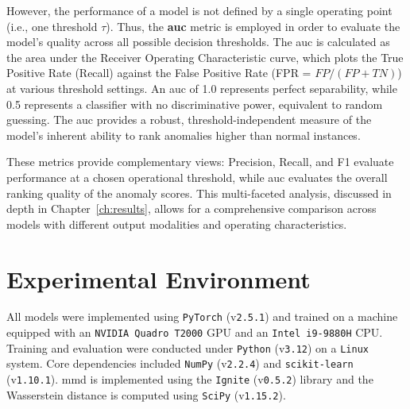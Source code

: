 However, the performance of a model is not defined by a single operating point (i.e., one threshold $\tau$). 
Thus, the \textbf{\gls{auc}} metric is employed in order to evaluate the model's quality across all possible decision thresholds. 
The \gls{auc} is calculated as the area under the Receiver Operating Characteristic curve, which plots the True Positive Rate (Recall) against the False Positive Rate (FPR = $FP / (FP + TN)$) at various threshold settings. 
An \gls{auc} of 1.0 represents perfect separability, while 0.5 represents a classifier with no discriminative power, equivalent to random guessing. 
The \gls{auc} provides a robust, threshold-independent measure of the model's inherent ability to rank anomalies higher than normal instances.

These metrics provide complementary views: Precision, Recall, and F1 evaluate performance at a chosen operational threshold, while \gls{auc} evaluates the overall ranking quality of the anomaly scores. This multi-faceted analysis, discussed in depth in Chapter~\ref{ch:results}, allows for a comprehensive comparison across models with different output modalities and operating characteristics.


\section{Experimental Environment}
\label{sec:exp-env}

All models were implemented using \texttt{PyTorch} (v\texttt{2.5.1}) and trained on a machine equipped with an \texttt{NVIDIA Quadro T2000} GPU and an \texttt{Intel i9-9880H} CPU.
Training and evaluation were conducted under \texttt{Python} (v\texttt{3.12}) on a \texttt{Linux} system.
Core dependencies included \texttt{NumPy} (v\texttt{2.2.4}) and \texttt{scikit-learn} (v\texttt{1.10.1}).
\gls{mmd} is implemented using the \texttt{Ignite} (v\texttt{0.5.2}) library and the Wasserstein distance is computed using \texttt{SciPy} (v\texttt{1.15.2}).